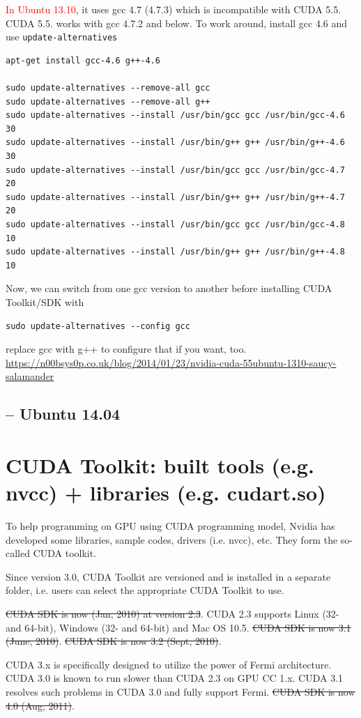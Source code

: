 \textcolor{red}{In Ubuntu 13.10}, it uses gcc 4.7 (4.7.3) which is incompatible
with CUDA 5.5. CUDA 5.5. works with gcc 4.7.2 and below. To work around, install
gcc 4.6 and use \verb!update-alternatives!
\begin{verbatim}
apt-get install gcc-4.6 g++-4.6

sudo update-alternatives --remove-all gcc
sudo update-alternatives --remove-all g++
sudo update-alternatives --install /usr/bin/gcc gcc /usr/bin/gcc-4.6 30
sudo update-alternatives --install /usr/bin/g++ g++ /usr/bin/g++-4.6 30
sudo update-alternatives --install /usr/bin/gcc gcc /usr/bin/gcc-4.7 20
sudo update-alternatives --install /usr/bin/g++ g++ /usr/bin/g++-4.7 20
sudo update-alternatives --install /usr/bin/gcc gcc /usr/bin/gcc-4.8 10
sudo update-alternatives --install /usr/bin/g++ g++ /usr/bin/g++-4.8 10
\end{verbatim}

Now, we can switch from one gcc version to another before installing CUDA
Toolkit/SDK with
\begin{verbatim}
sudo update-alternatives --config gcc 
\end{verbatim}
replace gcc with g++ to configure that if you want, too.
\url{https://n00bsys0p.co.uk/blog/2014/01/23/nvidia-cuda-55ubuntu-1310-saucy-salamander}

\subsection{-- Ubuntu 14.04}

\section{CUDA Toolkit: built tools (e.g. nvcc) + libraries (e.g. cudart.so)}
\label{sec:cuda-toolkit}

To help programming on GPU using CUDA programming model, Nvidia has developed
some libraries, sample codes, drivers (i.e. nvcc), etc. They form the so-called
CUDA toolkit. 

Since version 3.0, CUDA Toolkit are versioned and is installed in a separate
folder, i.e. users can select the appropriate CUDA Toolkit to use.

\sout{CUDA SDK is now (Jan, 2010) at version 2.3}. CUDA 2.3 supports Linux (32-
and 64-bit), Windows (32- and 64-bit) and Mac OS 10.5. \sout{CUDA SDK is now 3.1
(June, 2010)}. \sout{CUDA SDK is now 3.2 (Sept, 2010)}. 

CUDA 3.x is specifically designed to utilize the power of Fermi architecture. 
CUDA 3.0 is known to run slower than CUDA 2.3 on GPU CC 1.x. CUDA 3.1 resolves
such problems in CUDA 3.0 and fully support Fermi. \sout{CUDA SDK is now 4.0
(Aug, 2011)}.

